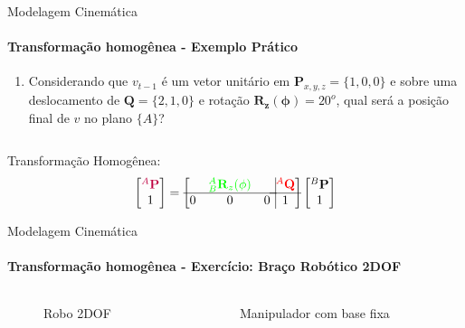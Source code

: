 \documentclass{beamer}
\begin{document}
\begin{frame}{Modelagem Cinemática}
    \framesubtitle{Transformação homogênea - Exemplo Prático}
    \begin{enumerate}
        \item Considerando que $v_{t-1}$ é um vetor unitário em $\mathbf{P}_{x,y,z}=\{1,0,0\}$ e sobre uma deslocamento de $\mathbf{Q}=\{2,1,0\}$ e rotação $\mathbf{R_z(\phi)}=20^o$, qual será a posição final de $v$ no plano $\{A\}$?
    \end{enumerate}
    \begin{columns}
        \begin{column}[c]{0.5\textwidth}
            
        \end{column}
        \begin{column}[c]{0.5\textwidth}
            
        \end{column}
    \end{columns}
    Transformação Homogênea:
    \begin{equation*}
        \begin{bmatrix}
            \color{purple}{{}^A\mathbf{P}} \\ 1
        \end{bmatrix}
        =
        \left[
            \begin{matrix}
                  & \color{green}{{}_B^A\mathbf{R}_z(\phi)} &   \\ \hline
                0 & 0                                       & 0 \\
            \end{matrix} \right.
            \left.
            \vline
            \begin{matrix}
                \color{red}{{}^A\mathbf{Q}} \\ \hline
                1
            \end{matrix} \right]
        \begin{bmatrix}
            {}^B\mathbf{P} \\
            1
        \end{bmatrix}
    \end{equation*}
\end{frame}




\begin{frame}{Modelagem Cinemática}
    \framesubtitle{Transformação homogênea - Exercício: Braço Robótico 2DOF}

    \begin{columns}
        \begin{column}[c]{0.5\textwidth}
            \begin{figure}[!ht]
                
                \caption{Robo 2DOF}
            \end{figure}
        \end{column}
        \begin{column}[c]{0.5\textwidth}
            Manipulador com base fixa
        \end{column}
    \end{columns}
\end{frame}
\end{document}
